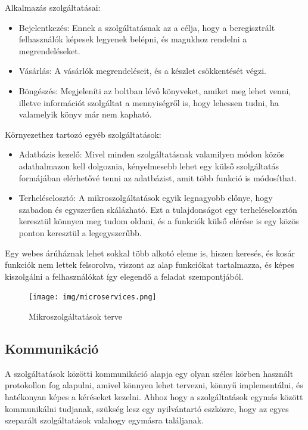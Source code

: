 \documentclass[11pt,magyar,a4paper,twoside,]{report}
\providecommand{\tightlist}{%
  \setlength{\itemsep}{0pt}\setlength{\parskip}{0pt}}
\begin{document}
Alkalmazás szolgáltatásai:

\begin{itemize}
\tightlist
\item
  Bejelentkezés: Ennek a szolgáltatásnak az a célja, hogy a
  beregisztrált felhasználók képesek legyenek belépni, és magukhoz
  rendelni a megrendeléseket.
\item
  Vásárlás: A vásárlók megrendeléseit, és a készlet csökkentését végzi.
\item
  Böngészés: Megjeleníti az boltban lévő könyveket, amiket meg lehet
  venni, illetve információt szolgáltat a mennyiségről is, hogy lehessen
  tudni, ha valamelyik könyv már nem kapható.
\end{itemize}

Környezethez tartozó egyéb szolgáltatások:

\begin{itemize}
\tightlist
\item
  Adatbázis kezelő: Mivel minden szolgáltatásnak valamilyen módon közös
  adathalmazon kell dolgoznia, kényelmesebb lehet egy külső szolgáltatás
  formájában elérhetővé tenni az adatbázist, amit több funkció is
  módosíthat.
\item
  Terheléselosztó: A mikroszolgáltatások egyik legnagyobb előnye, hogy
  szabadon és egyszerűen skálázható. Ezt a tulajdonságot egy
  terheléselosztón keresztül könnyen meg tudom oldani, és a funkciók
  külső elérése is egy közös ponton keresztül a legegyszerűbb.
\end{itemize}

Egy webes árúháznak lehet sokkal több alkotó eleme is, hiszen keresés,
és kosár funkciók nem lettek felsorolva, viszont az alap funkciókat
tartalmazza, és képes kiszolgálni a felhasználókat így elegendő a
feladat szempontjából.

\begin{figure}[H]
\centering
\texttt{[image: img/microservices.png]}
\caption{Mikroszolgáltatások terve}
\end{figure}

\subsection{Kommunikáció}\label{kommunikuxe1ciuxf3}

A szolgáltatások közötti kommunikáció alapja egy olyan széles körben
használt protokollon fog alapulni, amivel könnyen lehet tervezni, könnyű
implementálni, és hatékonyan képes a kéréseket kezelni. Ahhoz hogy a
szolgáltatások egymás között kommunikálni tudjanak, szükség lesz egy
nyilvántartó eszközre, hogy az egyes szeparált szolgáltatások valahogy
egymásra találjanak.
\end{document}
